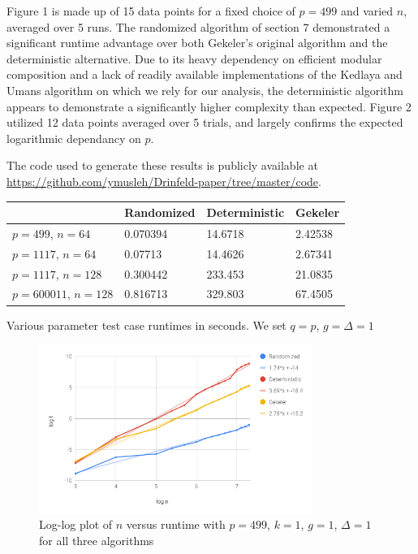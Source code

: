 \documentclass[sigconf]{acmart}
\begin{document}
Figure 1 is made up of 15 data points for a fixed choice of $p = 499$ and varied $n$, averaged over 5 runs. The randomized algorithm of section 7 demonstrated a significant runtime advantage over both Gekeler's original algorithm and the deterministic alternative. Due to its heavy dependency on efficient modular composition and a lack of readily available implementations of the Kedlaya and Umans algorithm on which we rely for our analysis, the deterministic algorithm appears to demonstrate a significantly higher complexity than expected. Figure 2 utilized 12 data points averaged over 5 trials, and largely confirms the expected logarithmic dependancy on $p$.

The code used to generate these results is publicly available at \url{https://github.com/ymusleh/Drinfeld-paper/tree/master/code}.

\begin{center}
\begin{tabular}{ | m{2.1cm} | m{1.6cm}| m{1.6cm} | m{1.6cm} | } 
\hline
 & Randomized & Deterministic & Gekeler  \\ 
\hline
$p = 499$, $n=64$ & 0.070394 &	14.6718 &	2.42538 &
\\
\hline 
$p = 1117$, $n=64$  & 0.07713 & 14.4626 & 2.67341
 & \\ 
\hline
$p = 1117$, $n=128$ & 0.300442 & 233.453 & 21.0835 & \\
\hline 

$p = 600011$, $n = 128$ &0.816713 & 329.803 & 67.4505 \\

\hline
\end{tabular}
\end{center}
\begin{table}[h!]
  \centering
  \caption{Various parameter test case runtimes in seconds. We set $q = p$, $g = \Delta = 1$}
  \label{tab:table-sample}
\end{table}

\begin{figure}[h!]\label{fig:ntest499}
\centering
  \includegraphics[width=3.5in]{chart-499.png}
  \caption{Log-log plot of $n$ versus runtime with $p = 499$, $k = 1$, $g = 1$, $\Delta = 1$ for all three algorithms}
\end{figure}
\end{document}
